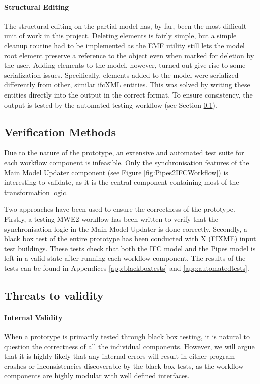 \paragraph{Structural Editing} The structural editing on the partial model has, by far, been the most difficult unit of work in this project. Deleting elements is fairly simple, but a simple cleanup routine had to be implemented as the EMF utility still lets the model root element preserve a reference to the object even when marked for deletion by the user. Adding elements to the model, however, turned out give rise to some serialization issues. Specifically, elements added to the model were serialized differently from other, similar ifcXML entities. This was solved by writing these entities directly into the output in the correct format. To ensure consistency, the output is tested by the automated testing workflow (see Section \ref{subsec:verification_methods}).

\subsection{Verification Methods}
\label{subsec:verification_methods}
Due to the nature of the prototype, an extensive and automated test suite for each workflow component is infeasible. Only the synchronisation features of the Main Model Updater component (see Figure \ref{fig:Pipes2IFCWorkflow}) is interesting to validate, as it is the central component containing most of the transformation logic.

Two approaches have been used to ensure the correctness of the prototype. Firstly, a testing MWE2 workflow has been written to verify that the synchronisation logic in the Main Model Updater is done correctly. Secondly, a black box test of the entire prototype has been conducted with X (FIXME) input test buildings. These tests check that both the IFC model and the Pipes model is left in a valid state after running each workflow component. The results of the tests can be found in Appendices \ref{app:blackboxtests} and \ref{app:automatedtests}.

\subsection{Threats to validity}
\paragraph{Internal Validity} When a prototype is primarily tested through black box testing, it is natural to question the correctness of all the individual components. However, we will argue that it is highly likely that any internal errors will result in either program crashes or inconsistencies discoverable by the black box tests, as the workflow components are highly modular with well defined interfaces.


